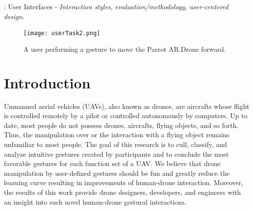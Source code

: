 \documentclass{sigchi}
\begin{document}

: User Interfaces - \emph{Interaction styles, evaluation/methodology, user-centered design.}

\begin{figure}[!h]
\centering
\texttt{[image: userTask2.png]}
\caption{A user performing a gesture to move the Parrot AR.Drone forward.}
\label{fig:userTask2}
\end{figure}

\section{Introduction}

Unmanned aerial vehicles (UAVs), also known as drones, are aircrafts whose flight is controlled remotely by a pilot or controlled autonomously by computers. Up to date, most people do not possess drones, aircrafts, flying objects, and so forth. Thus, the manipulation over or the interaction with a flying object remains unfamiliar to most people. The goal of this research is to cull, classify, and analyze intuitive gestures created by participants and to conclude the most favorable gestures for each function set of a UAV. We believe that drone manipulation by user-defined gestures should be fun and greatly reduce the learning curve resulting in improvements of human-drone interaction. Moreover, the results of this work provide drone designers, developers, and engineers with an insight into such novel human-drone gestural interactions.
\end{document}

